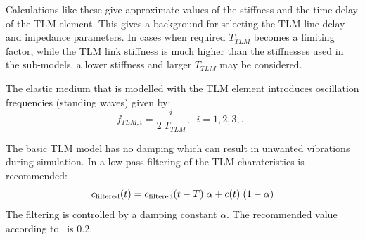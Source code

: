 Calculations like these give approximate values of the stiffness and the time delay of the TLM element. 
This gives a background for selecting the TLM line delay and impedance parameters.
In cases when required $T_{TLM}$ becomes a limiting factor, while the TLM link stiffness is much higher than the stiffnesses used in the sub-models, a lower stiffness and larger $T_{TLM}$ may be considered.

The elastic medium that is modelled with the TLM element introduces oscillation frequencies (standing waves) given by:
\begin{equation}
\label{eqTspring}
f_{TLM, i} = \frac{i}{2\;T_{TLM}}, \;\; i = 1, 2, 3, ...
\end{equation}

The basic TLM model has no damping which can result in unwanted vibrations during simulation.
In \cite{KrusModMech-99} a low pass filtering of the TLM charateristics is recommended:
\begin{equation}
c_{\mbox{{\scriptsize {filtered}}}}(t) = c_{\mbox{{\scriptsize {filtered}}}}(t - T) \; \alpha + c(t) \; (1 - \alpha)
\end{equation}
The filtering is controlled by a damping constant $\alpha$. 
The recommended value according to~ \cite{KrusModMech-99} is $0.2$.

